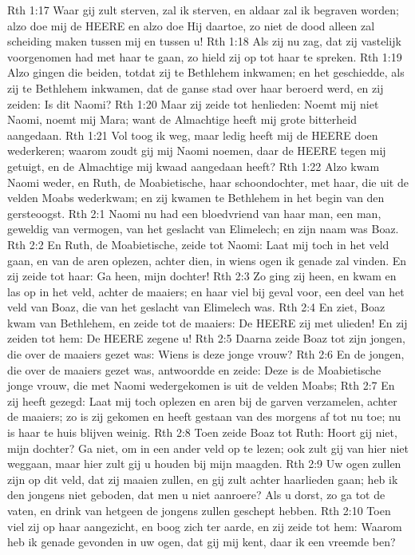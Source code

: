 Rth 1:17  Waar gij zult sterven, zal ik sterven, en aldaar zal ik begraven worden; alzo doe mij de HEERE en alzo doe Hij daartoe, zo niet de dood alleen zal scheiding maken tussen mij en tussen u!
Rth 1:18  Als zij nu zag, dat zij vastelijk voorgenomen had met haar te gaan, zo hield zij op tot haar te spreken.
Rth 1:19  Alzo gingen die beiden, totdat zij te Bethlehem inkwamen; en het geschiedde, als zij te Bethlehem inkwamen, dat de ganse stad over haar beroerd werd, en zij zeiden: Is dit Naomi?
Rth 1:20  Maar zij zeide tot henlieden: Noemt mij niet Naomi, noemt mij Mara; want de Almachtige heeft mij grote bitterheid aangedaan.
Rth 1:21  Vol toog ik weg, maar ledig heeft mij de HEERE doen wederkeren; waarom zoudt gij mij Naomi noemen, daar de HEERE tegen mij getuigt, en de Almachtige mij kwaad aangedaan heeft?
Rth 1:22  Alzo kwam Naomi weder, en Ruth, de Moabietische, haar schoondochter, met haar, die uit de velden Moabs wederkwam; en zij kwamen te Bethlehem in het begin van den gersteoogst.
Rth 2:1  Naomi nu had een bloedvriend van haar man, een man, geweldig van vermogen, van het geslacht van Elimelech; en zijn naam was Boaz.
Rth 2:2  En Ruth, de Moabietische, zeide tot Naomi: Laat mij toch in het veld gaan, en van de aren oplezen, achter dien, in wiens ogen ik genade zal vinden. En zij zeide tot haar: Ga heen, mijn dochter!
Rth 2:3  Zo ging zij heen, en kwam en las op in het veld, achter de maaiers; en haar viel bij geval voor, een deel van het veld van Boaz, die van het geslacht van Elimelech was.
Rth 2:4  En ziet, Boaz kwam van Bethlehem, en zeide tot de maaiers: De HEERE zij met ulieden! En zij zeiden tot hem: De HEERE zegene u!
Rth 2:5  Daarna zeide Boaz tot zijn jongen, die over de maaiers gezet was: Wiens is deze jonge vrouw?
Rth 2:6  En de jongen, die over de maaiers gezet was, antwoordde en zeide: Deze is de Moabietische jonge vrouw, die met Naomi wedergekomen is uit de velden Moabs;
Rth 2:7  En zij heeft gezegd: Laat mij toch oplezen en aren bij de garven verzamelen, achter de maaiers; zo is zij gekomen en heeft gestaan van des morgens af tot nu toe; nu is haar te huis blijven weinig.
Rth 2:8  Toen zeide Boaz tot Ruth: Hoort gij niet, mijn dochter? Ga niet, om in een ander veld op te lezen; ook zult gij van hier niet weggaan, maar hier zult gij u houden bij mijn maagden.
Rth 2:9  Uw ogen zullen zijn op dit veld, dat zij maaien zullen, en gij zult achter haarlieden gaan; heb ik den jongens niet geboden, dat men u niet aanroere? Als u dorst, zo ga tot de vaten, en drink van hetgeen de jongens zullen geschept hebben.
Rth 2:10  Toen viel zij op haar aangezicht, en boog zich ter aarde, en zij zeide tot hem: Waarom heb ik genade gevonden in uw ogen, dat gij mij kent, daar ik een vreemde ben?
